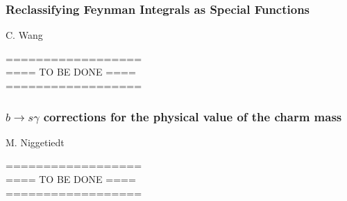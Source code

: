 \documentclass{FBR_Bericht_2025}
\begin{document}
\begin{refsection}
\subsubsection{Reclassifying Feynman Integrals as Special Functions}
\begin{Namen}
C. Wang
\end{Namen}
%
{\color{red} ==================\\ ====\; TO BE DONE\; ====\\ ==================}
%
%
\subsubsection{$b\rightarrow s \gamma$ corrections for the physical value of the charm mass}
\begin{Namen}
M. Niggetiedt
\end{Namen}
%
{\color{red} ==================\\ ====\; TO BE DONE\; ====\\ ==================}

\printbibliography[heading=subbibliography]
\end{refsection}

\end{document}
